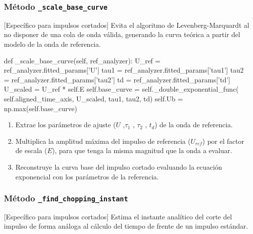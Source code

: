 \subsubsection{Método \texttt{\_scale\_base\_curve}}
[Específico para impulsos cortados] Evita el algoritmo de Levenberg-Marquardt al no disponer de una cola de onda válida, generando la curva teórica a partir del modelo de la onda de referencia.

\begin{python}
def _scale_base_curve(self, ref_analyzer):
    U_ref = ref_analyzer.fitted_params['U']
    tau1 = ref_analyzer.fitted_params['tau1']
    tau2 = ref_analyzer.fitted_params['tau2']
    td = ref_analyzer.fitted_params['td']
    U_scaled = U_ref * self.E
    self.base_curve = self._double_exponential_func(
        self.aligned_time_axis,
        U_scaled,
        tau1,
        tau2,
        td)
    self.Ub = np.max(self.base_curve)
\end{python}

\begin{enumerate}
    \item Extrae los parámetros de ajuste ($U$ ,$\tau_1$ , $\tau_2$ , $t_d$) de la onda de referencia.
    \item Multiplica la amplitud máxima del impulso de referencia ($U_{ref}$) por el factor de escala ($E$), para que tenga la misma magnitud que la onda a evaluar.
    \item Reconstruye la curva base del impulso cortado evaluando la ecuación exponencial con los parámetros de la referencia.
\end{enumerate}

\subsubsection{Método \texttt{\_find\_chopping\_instant}}
[Específico para impulsos cortados] Estima el instante analítico del corte del impulso de forma análoga al cálculo del tiempo de frente de un impulso estándar.

